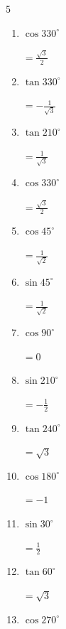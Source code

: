 \begin{multicols}{5}
\begin{enumerate}
        $\displaystyle =0$

  \item $\displaystyle \cos{330^\circ}$

        $\displaystyle =\frac{\sqrt{3}}{2}$

  \item $\displaystyle \tan{330^\circ}$

        $\displaystyle =-\frac{1}{\sqrt{3}}$

  \item $\displaystyle \tan{210^\circ}$

        $\displaystyle =\frac{1}{\sqrt{3}}$

  \item $\displaystyle \cos{330^\circ}$

        $\displaystyle =\frac{\sqrt{3}}{2}$

  \item $\displaystyle \cos{45^\circ}$

        $\displaystyle =\frac{1}{\sqrt{2}}$

  \item $\displaystyle \sin{45^\circ}$

        $\displaystyle =\frac{1}{\sqrt{2}}$

  \item $\displaystyle \cos{90^\circ}$

        $\displaystyle =0$

  \item $\displaystyle \sin{210^\circ}$

        $\displaystyle =-\frac{1}{2}$

  \item $\displaystyle \tan{240^\circ}$

        $\displaystyle =\sqrt{3}$

  \item $\displaystyle \cos{180^\circ}$

        $\displaystyle =-1$

  \item $\displaystyle \sin{30^\circ}$

        $\displaystyle =\frac{1}{2}$

\columnbreak %

  \item $\displaystyle \tan{60^\circ}$

        $\displaystyle =\sqrt{3}$

  \item $\displaystyle \cos{270^\circ}$


\end{enumerate}
\end{multicols}
